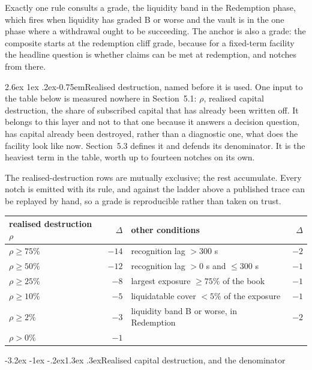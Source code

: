 \documentclass[11pt]{article}
\makeatletter
\renewcommand\subsection{\@startsection{subsection}{2}{\z@}%
  {-3.2ex \@plus -1ex \@minus -.2ex}{1.3ex \@plus .3ex}{\normalfont\large\bfseries}}
\renewcommand\paragraph{\@startsection{paragraph}{4}{\z@}%
  {2.6ex \@plus 1ex \@minus .2ex}{-0.75em}{\normalfont\normalsize\bfseries}}
\theoremstyle{orma}
\theoremstyle{ormaupright}
\makeatother
\begin{document}
Exactly one rule consults a grade, the
liquidity band in the Redemption phase, which fires when liquidity has graded B or worse and
the vault is in the one phase where a withdrawal ought to be succeeding. The anchor is also a
grade: the composite starts at the redemption cliff grade, because for a fixed-term facility
the headline question is whether claims can be met at redemption, and notches from there.

\paragraph{Realised destruction, named before it is used.} One input to the table below is
measured nowhere in Section~5.1: $\rho$, realised capital destruction, the share of
subscribed capital that has already been written off. It belongs to this layer and not to
that one because it answers a decision question, has capital already been destroyed, rather
than a diagnostic one, what does the facility look like now. Section~5.3 defines it and
defends its denominator. It is the heaviest term in the table, worth up to fourteen notches
on its own.

The realised-destruction rows are mutually exclusive; the rest accumulate. Every notch is
emitted with its rule, and against the ladder above a published trace can be replayed by
hand, so a grade is reproducible rather than taken on trust.

\begin{center}
\small
\setlength{\tabcolsep}{7pt}
\begin{tabular}{lrlr}
\toprule
realised destruction $\rho$ & $\Delta$ & other conditions & $\Delta$ \\
\midrule
$\rho \geq 75\%$ & $-14$ & recognition lag $> 300$ s & $-2$ \\
$\rho \geq 50\%$ & $-12$ & recognition lag $> 0$ s and $\leq 300$ s & $-1$ \\
$\rho \geq 25\%$ & $-8$ & largest exposure $\geq 75\%$ of the book & $-1$ \\
$\rho \geq 10\%$ & $-5$ & liquidatable cover $< 5\%$ of the exposure & $-1$ \\
$\rho \geq 2\%$ & $-3$ & liquidity band B or worse, in Redemption & $-2$ \\
$\rho > 0\%$ & $-1$ & & \\
\bottomrule
\end{tabular}
\end{center}

\subsection{Realised capital destruction, and the denominator}
\end{document}
